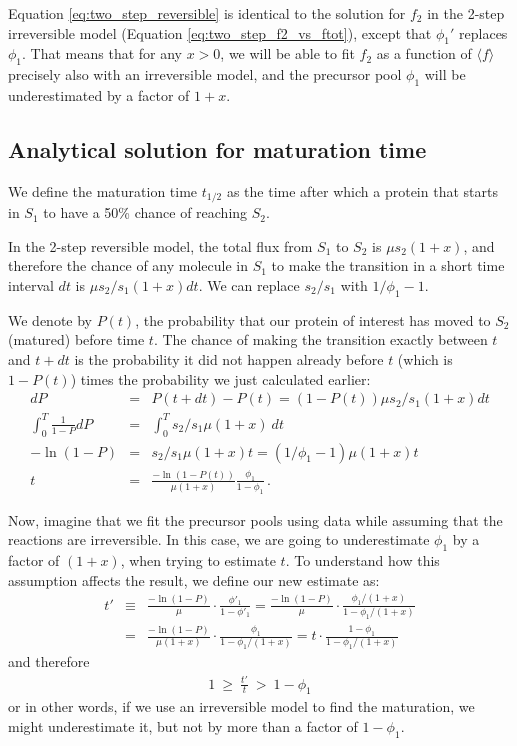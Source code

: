 \documentclass{article}
\newcommand{\fin}{\ensuremath{\langle f \rangle}}
\begin{document}
Equation \ref{eq:two_step_reversible} is identical to the solution for $f_2$ in the 2-step irreversible model (Equation \ref{eq:two_step_f2_vs_ftot}), except that $\phi_1'$ replaces $\phi_1$. That means that for any $x > 0$, we will be able to fit $f_2$ as a function of $\fin$ precisely also with an irreversible model, and the precursor pool $\phi_1$ will be underestimated by a factor of $1+x$.

\subsection{Analytical solution for maturation time}
We define the maturation time $t_{1/2}$ as the time after which a protein that starts in $S_1$ to have a 50\% chance of reaching $S_2$. 

In the 2-step reversible model, the total flux from $S_1$ to $S_2$ is $\mu s_2 (1+x)$, and therefore the chance of any molecule in $S_1$ to make the transition in a short time interval $dt$ is $\mu s_2/s_1 (1+x) dt$. We can replace $s_2/s_1$ with $1/\phi_1 - 1$.

We denote by $P(t)$, the probability that our protein of interest has moved to $S_2$ (matured) before time $t$. The chance of making the transition exactly between $t$ and $t+dt$ is the probability it did not happen already before $t$ (which is $1 - P(t)$) times the probability we just calculated earlier:
\begin{eqnarray}
    dP &=& P(t + dt) - P(t) = \left(1 - P(t)\right) \mu s_2/s_1 (1+x) dt \\
    \int_0^T \frac{1}{1-P} dP &=& \int_0^T s_2/s_1 \mu (1+x)~dt  \\
    -\ln(1-P) &=& s_2/s_1 \mu (1+x)t = (1/\phi_1 - 1)\mu (1+x)t  \\
    t &=& \frac{-\ln(1-P(t))}{\mu (1+x)} \frac{\phi_1}{1 - \phi_1}\,.
\end{eqnarray}

Now, imagine that we fit the precursor pools using data while assuming that the reactions are irreversible. In this case, we are going to underestimate $\phi_1$ by a factor of $(1+x)$, when trying to estimate $t$. To understand how this assumption affects the result, we define our new estimate as:
\begin{eqnarray}
    t' &\equiv& \frac{-\ln(1-P)}{\mu} \cdot \frac{\phi'_1}{1 - \phi'_1} 
    = \frac{-\ln(1-P)}{\mu} \cdot \frac{\phi_1/(1+x)}{1 - \phi_1/(1+x)} \nonumber\\
    &=& \frac{-\ln(1-P)}{\mu (1+x)} \cdot \frac{\phi_1}{1 - \phi_1/(1+x)} 
    = t \cdot \frac{1 - \phi_1}{1 - \phi_1/(1+x)}
\end{eqnarray}
and therefore
\begin{eqnarray}
    1 ~\geq~ \frac{t'}{t} ~>~ 1-\phi_1
\end{eqnarray}
or in other words, if we use an irreversible model to find the maturation, we might underestimate it, but not by more than a factor of $1-\phi_1$.
\end{document}
